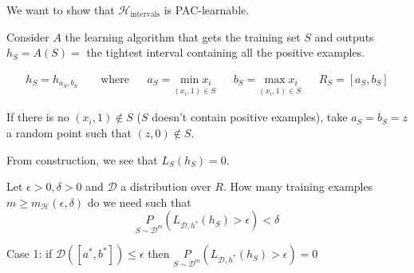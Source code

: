 \documentclass{article}
\newcommand{\<}{\langle}
\renewcommand{\>}{\rangle}
\theoremstyle{definition}
\def\gD{{\mathcal{D}}}
\def\gH{{\mathcal{H}}}
\newcommand{\uset}{\underset}
\newcommand{\uset}{\underset}
\begin{document}
\begin{figure}[h]
\centering
{}
\end{figure}

We want to show that $\gH_\text{intervals}$ is PAC-learnable.

Consider $A$ the learning algorithm that gets the training set $S$ and outputs $h_S = A(S) = $ the tightest
interval containing all the positive examples.

\begin{align*}
  h_S = h_{a_S, b_S} \qquad \text{where} &&
  a_S = \uset{(x_i, 1) \in S}{\min x_i} &&
  b_S = \uset{(x_i, 1) \in S}{\max x_i} &&
  R_S = [a_S, b_S]
\end{align*}

If there is no $(x_i, 1) \notin S$ ($S$ doesn't contain positive examples), take %
$a_S = b_S = z$ a random point such that $(z, 0) \notin S$.

From construction, we see that $L_S(h_S) = 0$.

Let $\epsilon > 0, \delta > 0$ and $\gD$ a distribution over $R$.
How many training examples $m \geq m_{\gH}(\epsilon, \delta)$ do we need such that
\begin{equation*}
  \uset{S \sim \gD^m}{P}(L_{\gD, h^*}(h_S) > \epsilon) < \delta
\end{equation*}

Case 1: if $\gD([a^*, b^*]) \leq \epsilon$ then
  $\uset{S \sim \gD^m}{P}(L_{\gD, h^*}(h_S) > \epsilon) = 0$ \checkmark
\end{document}
